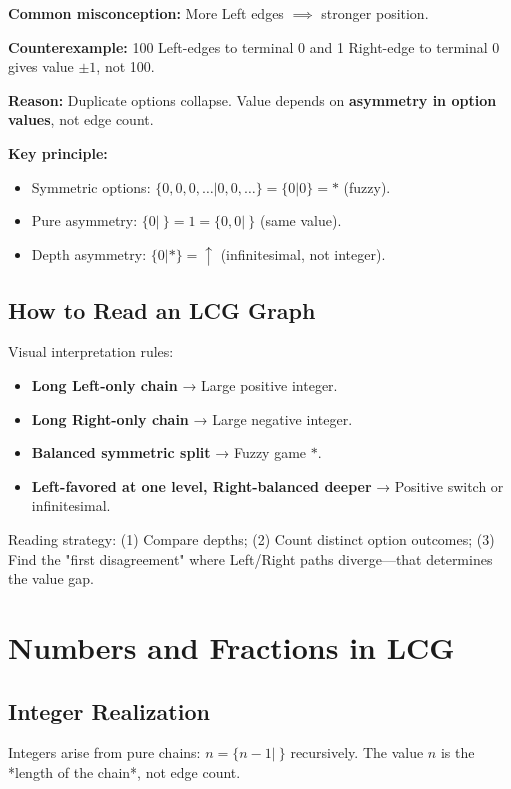 \documentclass[10pt,a4paper,twocolumn]{article}
\theoremstyle{plain}
\theoremstyle{definition}
\theoremstyle{remark}
\begin{document}
\textbf{Common misconception:} More Left edges $\implies$ stronger position.

\textbf{Counterexample:} 100 Left-edges to terminal 0 and 1 Right-edge to terminal 0 gives value $\pm 1$, not 100.

\textbf{Reason:} Duplicate options collapse. Value depends on \textbf{asymmetry in option values}, not edge count.

\textbf{Key principle:}
\begin{itemize}
\item Symmetric options: $\{0, 0, 0, \ldots | 0, 0, \ldots\} = \{0|0\} = *$ (fuzzy).
\item Pure asymmetry: $\{0|\ \} = 1 = \{0, 0|\ \}$ (same value).
\item Depth asymmetry: $\{0 | *\} = \uparrow$ (infinitesimal, not integer).
\end{itemize}

\subsection{How to Read an LCG Graph}

Visual interpretation rules:

\begin{itemize}
\item \textbf{Long Left-only chain} → Large positive integer.
\item \textbf{Long Right-only chain} → Large negative integer.
\item \textbf{Balanced symmetric split} → Fuzzy game $*$.
\item \textbf{Left-favored at one level, Right-balanced deeper} → Positive switch or infinitesimal.
\end{itemize}

Reading strategy: (1) Compare depths; (2) Count distinct option outcomes; (3) Find the "first disagreement" where Left/Right paths diverge—that determines the value gap.

\section{Numbers and Fractions in LCG}

\subsection{Integer Realization}

Integers arise from pure chains: $n = \{n-1|\ \}$ recursively. The value $n$ is the *length of the chain*, not edge count.
\end{document}
